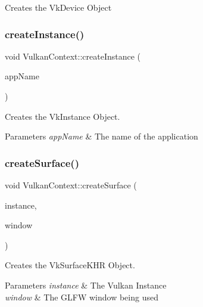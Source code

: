 Creates the Vk\+Device Object \mbox{\label{class_vulkan_context_a8b9ae9353949c8aedae2d83ae26e36b1}} 
\subsubsection{\texorpdfstring{createInstance()}{createInstance()}}
{\footnotesize\ttfamily void Vulkan\+Context\+::create\+Instance (\begin{DoxyParamCaption}\item[{const std\+::string \&}]{app\+Name }\end{DoxyParamCaption})\hspace{0.3cm}{\ttfamily [private]}}



Creates the Vk\+Instance Object. 


\begin{DoxyParams}{Parameters}
{\em app\+Name} & The name of the application \\
\hline
\end{DoxyParams}
\mbox{\label{class_vulkan_context_add181a467a57654e64f9ae2c6345e107}} 
\subsubsection{\texorpdfstring{createSurface()}{createSurface()}}
{\footnotesize\ttfamily void Vulkan\+Context\+::create\+Surface (\begin{DoxyParamCaption}\item[{Vk\+Instance}]{instance,  }\item[{G\+L\+F\+Wwindow $\ast$}]{window }\end{DoxyParamCaption})\hspace{0.3cm}{\ttfamily [private]}}



Creates the Vk\+Surface\+K\+HR Object. 


\begin{DoxyParams}{Parameters}
{\em instance} & The Vulkan Instance\\
\hline
{\em window} & The G\+L\+FW window being used \\
\hline
\end{DoxyParams}
\mbox{\label{class_vulkan_context_aa38181d82d01ea61a372bf624d90cc36}} 

